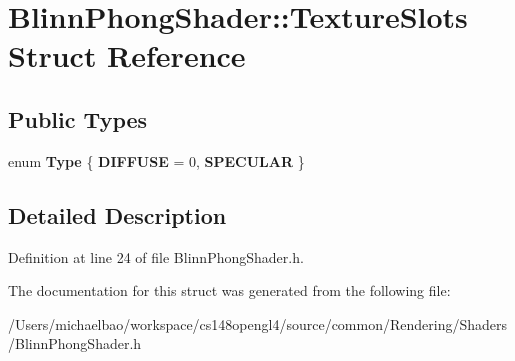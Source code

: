\hypertarget{struct_blinn_phong_shader_1_1_texture_slots}{}\section{Blinn\+Phong\+Shader\+:\+:Texture\+Slots Struct Reference}
\label{struct_blinn_phong_shader_1_1_texture_slots}
\subsection*{Public Types}
\begin{DoxyCompactItemize}
\item 
\hypertarget{struct_blinn_phong_shader_1_1_texture_slots_a98940b49ba855ee47d61a6243c05c34d}{}enum {\bfseries Type} \{ {\bfseries D\+I\+F\+F\+U\+S\+E} = 0, 
{\bfseries S\+P\+E\+C\+U\+L\+A\+R}
 \}\label{struct_blinn_phong_shader_1_1_texture_slots_a98940b49ba855ee47d61a6243c05c34d}

\end{DoxyCompactItemize}


\subsection{Detailed Description}


Definition at line 24 of file Blinn\+Phong\+Shader.\+h.



The documentation for this struct was generated from the following file\+:\begin{DoxyCompactItemize}
\item 
/\+Users/michaelbao/workspace/cs148opengl4/source/common/\+Rendering/\+Shaders/Blinn\+Phong\+Shader.\+h\end{DoxyCompactItemize}

